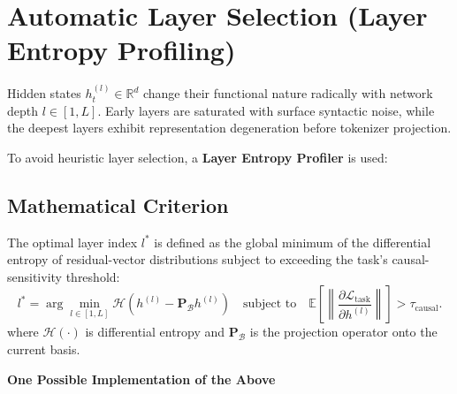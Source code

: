 \documentclass[11pt,a4paper]{article}
\begin{document}
\section{Automatic Layer Selection (Layer Entropy Profiling)}
Hidden states $h_t^{(l)}\in\mathbb{R}^d$ change their functional nature radically with network depth $l\in[1,L]$. Early layers are saturated with surface syntactic noise, while the deepest layers exhibit representation degeneration before tokenizer projection.

To avoid heuristic layer selection, a \textbf{Layer Entropy Profiler} is used:
\begin{figure}[h!]
\centering
{}
\end{figure}

\subsection*{Mathematical Criterion}
The optimal layer index $l^*$ is defined as the global minimum of the differential entropy of residual-vector distributions subject to exceeding the task's causal-sensitivity threshold:
\begin{equation}
l^*=\arg\min_{l\in[1,L]}\mathcal H\!\left(h^{(l)}-\mathbf P_{\mathcal B}h^{(l)}\right)\quad\text{subject to}\quad
\mathbb E\!\left[\left\|\frac{\partial\mathcal L_{\text{task}}}{\partial h^{(l)}}\right\|\right]>\tau_{\text{causal}}.
\end{equation}
where $\mathcal H(\cdot)$ is differential entropy and $\mathbf P_{\mathcal B}$ is the projection operator onto the current basis.

\clearpage
{}
{}
\begin{center}
{\Huge\bfseries One Possible Implementation of the Above\par}
\end{center}
\vspace{0.8cm}
\end{document}
